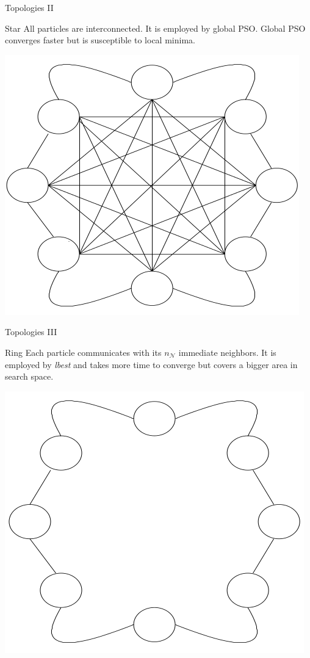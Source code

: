 \documentclass[aspectratio=169,compress,10pt]{beamer}
\begin{document}
\begin{frame}{Topologies II}
\begin{block}{Star}
All particles are interconnected. It is employed by global PSO.
Global PSO converges faster but is susceptible to local minima.

\centering
\includegraphics[scale=0.25]{../resources/star}
\end{block}
\end{frame}


\begin{frame}{Topologies III}
\begin{block}{Ring}
Each particle communicates with its $n_\mathcal{N}$ immediate neighbors.
It is employed by \emph{lbest} and takes more time to converge but covers a bigger area in search space.

\centering
\includegraphics[scale=0.25]{../resources/ring}
\end{block}
\end{frame}
\end{document}
